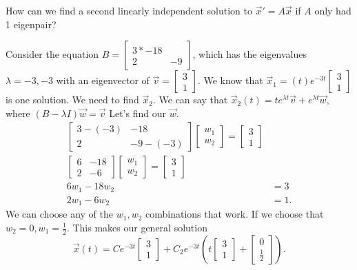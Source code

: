 How can we find a second linearly independent solution to $\vec{x}'=A\vec{x}$ if $A$ only had 1 eigenpair?
\begin{eg}
  Consider the equation $B=\begin{bmatrix} 3*-18\\2&-9 \end{bmatrix} $, which has the eigenvalues $\lambda=-3,-3$ with an eigenvector of $\vec{v}=\begin{bmatrix} 3\\1 \end{bmatrix} $. We know that $\vec{x}_1=(t)e^{-3t}\begin{bmatrix} 3\\1 \end{bmatrix} $ is one solution. We need to find $\vec{x}_2$. We can say that $\vec{x}_2(t)=te^{\lambda t}\vec{v}+e^{\lambda t}\vec{w}$, where $(B-\lambda I)\vec{w}=\vec{v}$ Let's find our $\vec{w}$.
  \begin{align*}
    \begin{bmatrix} 3-(-3)&-18\\2&-9-(-3) \end{bmatrix} \begin{bmatrix} w_1\\w_2 \end{bmatrix} =\begin{bmatrix} 3\\1 \end{bmatrix} \\
    \begin{bmatrix} 6&-18\\2&-6 \end{bmatrix} \begin{bmatrix} w_1\\w_2 \end{bmatrix} =\begin{bmatrix} 3\\1 \end{bmatrix} \\
    6w_1-18w_2&=3\\
    2w_1-6w_2&=1
  .\end{align*}
  We can choose any of the $w_1,w_2$ combinations that work. If we choose that $w_2=0,w_1=\frac{1}{2}$. This makes our general solution \[
    \vec{x}(t)=Ce^{-3t}\begin{bmatrix} 3\\1 \end{bmatrix} +C_2e^{-3t}\left( t\begin{bmatrix} 3\\1 \end{bmatrix} +\begin{bmatrix} 0\\\frac{1}{2} \end{bmatrix}  \right) 
  .\] 
\end{eg}
